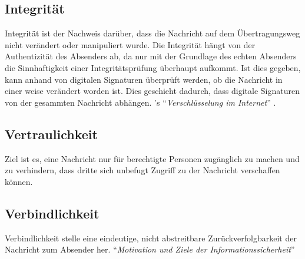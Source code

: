 \subsection{Integrität}

Integrität ist der Nachweis darüber, dass die Nachricht auf dem Übertragungsweg nicht verändert oder manipuliert wurde.
Die Integrität hängt von der Authentizität des Absenders ab, da nur mit der Grundlage des echten Absenders die Sinnhaftigkeit einer Integritätsprüfung überhaupt aufkommt.
Ist dies gegeben, kann anhand von digitalen Signaturen überprüft werden, ob die Nachricht in einer weise verändert worden ist.
Dies geschieht dadurch, dass digitale Signaturen von der gesammten Nachricht abhängen.
\citeauthor{richter}'s ``\emph{Verschlüsselung im Internet}'' \citep{richter}.


\subsection{Vertraulichkeit}
Ziel ist es, eine Nachricht nur für berechtigte Personen zugänglich zu machen und zu verhindern, dass dritte sich unbefugt Zugriff zu der Nachricht verschaffen können.


\subsection{Verbindlichkeit}
Verbindlichkeit stelle eine eindeutige, nicht abstreitbare Zurückverfolgbarkeit der Nachricht zum Absender her.
\citeauthor{wiki:itsec} ``\emph{Motivation und Ziele der Informationssicherheit}'' \citep{wiki:itsec}